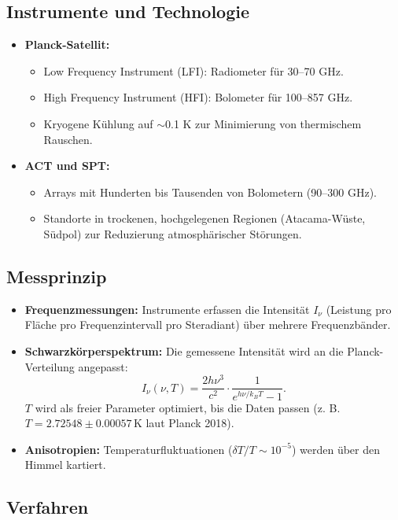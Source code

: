 \documentclass[a4paper,12pt]{article}
\theoremstyle{definition}
\theoremstyle{remark}
\begin{document}
	\subsection{Instrumente und Technologie}
	
	\begin{itemize}
		\item \textbf{Planck-Satellit:}
		\begin{itemize}
			\item Low Frequency Instrument (LFI): Radiometer für 30–70 GHz.
			\item High Frequency Instrument (HFI): Bolometer für 100–857 GHz.
			\item Kryogene Kühlung auf \(\sim\)0.1 K zur Minimierung von thermischem Rauschen.
		\end{itemize}
		\item \textbf{ACT und SPT:}
		\begin{itemize}
			\item Arrays mit Hunderten bis Tausenden von Bolometern (90–300 GHz).
			\item Standorte in trockenen, hochgelegenen Regionen (Atacama-Wüste, Südpol) zur Reduzierung atmosphärischer Störungen.
		\end{itemize}
	\end{itemize}
	
	\subsection{Messprinzip}
	
	\begin{itemize}
		\item \textbf{Frequenzmessungen:} Instrumente erfassen die Intensität $I_\nu$ (Leistung pro Fläche pro Frequenzintervall pro Steradiant) über mehrere Frequenzbänder.
		\item \textbf{Schwarzkörperspektrum:} Die gemessene Intensität wird an die Planck-Verteilung angepasst:
		\[
		I_\nu(\nu, T) = \frac{2 h \nu^3}{c^2} \cdot \frac{1}{e^{h \nu / k_B T} - 1}.
		\]
		$T$ wird als freier Parameter optimiert, bis die Daten passen (z. B. $T = 2.72548 \pm 0.00057 \, \text{K}$ laut Planck 2018).
		\item \textbf{Anisotropien:} Temperaturfluktuationen ($\delta T/T \sim 10^{-5}$) werden über den Himmel kartiert.
	\end{itemize}
	
	\subsection{Verfahren}
	
\end{document}
